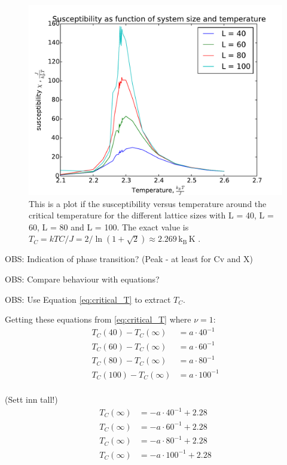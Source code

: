 \begin{figure}[H]
\includegraphics[width=\linewidth]{../results/4e/4e_x}\caption{This is a plot if the susceptibility versus temperature around the critical temperature for the different lattice sizes with L = 40, L = 60, L = 80 and L = 100. The exact value is $T_C =  kTC/J = 2/ \ln(1+\sqrt{
2}) \approx 2.269 \,\text{k}_\text{B} \,\text{K}$ \cite{Onsager}.}\label{fig:4e_suscept}
\end{figure}

OBS: Indication of phase transition? (Peak - at least for Cv and X)

OBS: Compare behaviour with equations?

OBS: Use Equation \ref{eq:critical_T} to extract $T_C$.

Getting these equations from \ref{eq:critical_T} where $\nu = 1$:
\begin{align*}
T_C(40) - T_C(\infty) &= a \cdot 40^{-1}\\
T_C(60) - T_C(\infty) &= a \cdot 60^{-1}\\
T_C(80) - T_C(\infty) &= a \cdot 80^{-1}\\
T_C(100) - T_C(\infty) &= a \cdot 100^{-1}\\
\end{align*}

(Sett inn tall!)
\begin{align}\label{eq:find_critial_T}
T_C(\infty) &= - a \cdot 40^{-1} + 2.28\\
T_C(\infty) &= - a \cdot 60^{-1} + 2.28\\
T_C(\infty) &= - a \cdot 80^{-1} + 2.28\\
T_C(\infty) &= - a \cdot 100^{-1} + 2.28\label{eq:find_critial_T_end}
\end{align}

